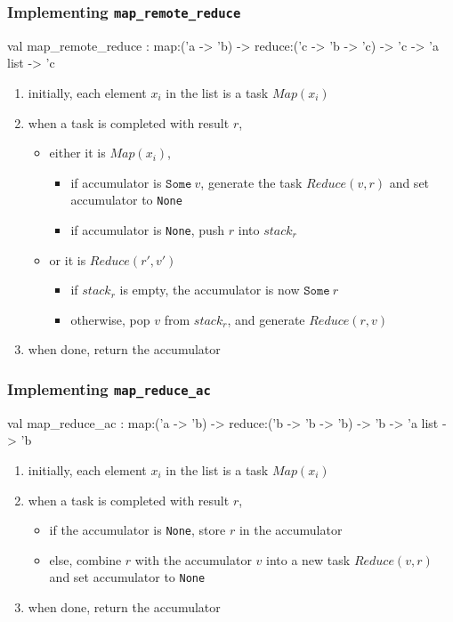 \documentclass{beamer}
\begin{document}
\begin{frame}\frametitle{Implementing \texttt{map\_remote\_reduce}}
  \begin{ocaml}
val map_remote_reduce :
  map:('a -> 'b) -> reduce:('c -> 'b -> 'c) -> 
  'c -> 'a list -> 'c
  \end{ocaml}



  \begin{enumerate}
  \item initially, each element $x_i$ in the list is a task $Map(x_i)$
  \item when a task is completed with result $r$,
    \begin{itemize}
    \item either it is $Map(x_i)$,
      \begin{itemize}
      \item if accumulator is $\texttt{Some}~v$, generate the task
        $Reduce(v,r)$ and set accumulator to \texttt{None}
      \item if accumulator is \texttt{None}, push $r$ into $\mathit{stack}_r$
      \end{itemize}
    \item or it is $Reduce(r',v')$
      \begin{itemize}
      \item if $\mathit{stack}_r$ is empty, the accumulator is now
        $\texttt{Some}~r$ 
      \item otherwise, pop $v$ from $\mathit{stack}_r$, and generate
        $Reduce(r,v)$ 
      \end{itemize}
    \end{itemize}
  \item when done, return the accumulator
  \end{enumerate}
\end{frame}

\begin{frame}\frametitle{Implementing \texttt{map\_reduce\_ac}}
  \begin{ocaml}
val map_reduce_ac :
  map:('a -> 'b) -> reduce:('b -> 'b -> 'b) -> 
  'b -> 'a list -> 'b
  \end{ocaml}



  \begin{enumerate}
  \item initially, each element $x_i$ in the list is a task $Map(x_i)$
  \item when a task is completed with result $r$,
    \begin{itemize}
    \item if the accumulator is \texttt{None}, store $r$ in the accumulator
    \item else, combine $r$ with the accumulator $v$ into a new task
      $Reduce(v, r)$ and set accumulator to \texttt{None}
    \end{itemize}
  \item when done, return the accumulator
  \end{enumerate}
\end{frame}
\end{document}
